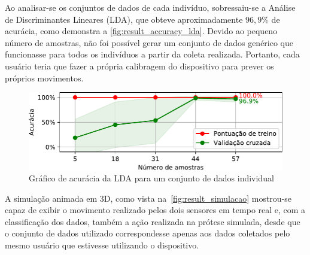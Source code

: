 Ao analisar-se os conjuntos de dados de cada indivíduo, sobressaiu-se a Análise de Discriminantes Lineares (LDA), que obteve aproximadamente \(96{,}9\%\) de acurácia, como demonstra a \autoref{fig:result_accuracy_lda}. Devido ao pequeno número de amostras, não foi possível gerar um conjunto de dados genérico que funcionasse para todos os indivíduos a partir da coleta realizada. Portanto, cada usuário teria que fazer a própria calibragem do dispositivo para prever os próprios movimentos.

\begin{figure}[ht]
	\caption{\label{fig:result_accuracy_lda}Gráfico de acurácia da LDA para um conjunto de dados individual}
	\begin{center}
	    \includegraphics[width=\textwidth]{resources/result_accuracy_lda}
	\end{center}
\end{figure}



A simulação animada em 3D, como vista na~\autoref{fig:result_simulacao} mostrou-se capaz de exibir o movimento realizado pelos dois sensores em tempo real e, com a classificação dos dados, também a ação realizada na prótese simulada, desde que o conjunto de dados utilizado correspondesse apenas aos dados coletados pelo mesmo usuário que estivesse utilizando o dispositivo.

